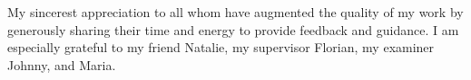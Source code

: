 My sincerest appreciation to all whom have augmented the quality of my work by generously sharing their time and energy to provide feedback and guidance. I am especially grateful to my friend Natalie, my supervisor Florian, my examiner Johnny, and Maria.
